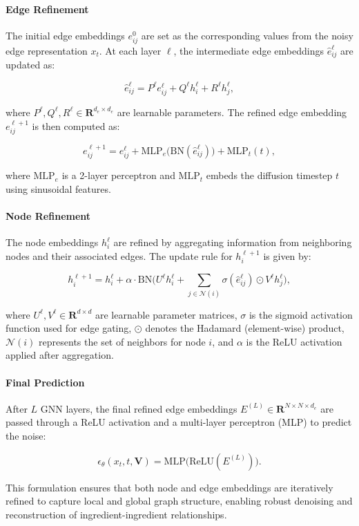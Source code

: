 \paragraph{Edge Refinement} The initial edge embeddings \( e_{ij}^0 \) are set as the corresponding values from the noisy edge representation \( x_t \). At each layer \( \ell \), the intermediate edge embeddings \( \hat{e}_{ij}^\ell \) are updated as:

\begin{equation*}
    \hat{e}_{ij}^\ell = P^\ell e_{ij}^\ell + Q^\ell h_i^\ell + R^\ell h_j^\ell,
\end{equation*}

where \( P^\ell, Q^\ell, R^\ell \in \mathbf{R}^{d_e \times d_e} \) are learnable parameters. The refined edge embedding \( e_{ij}^{\ell+1} \) is then computed as:

\begin{equation*}
    e_{ij}^{\ell+1} = e_{ij}^\ell + \text{MLP}_e\big(\text{BN}(\hat{e}_{ij}^\ell)\big) + \text{MLP}_t(t),
\end{equation*}

where \( \text{MLP}_e \) is a 2-layer perceptron and \( \text{MLP}_t \) embeds the diffusion timestep \( t \) using sinusoidal features.

\paragraph{Node Refinement}
The node embeddings \( h_i^\ell \) are refined by aggregating information from neighboring nodes and their associated edges. The update rule for \( h_i^{\ell+1} \) is given by:

\begin{equation*}
    h_i^{\ell+1} = h_i^\ell + \alpha \cdot \text{BN}\Big(U^\ell h_i^\ell + \sum_{j \in \mathcal{N}(i)} \sigma(\hat{e}_{ij}^\ell) \odot V^\ell h_j^\ell\Big),
\end{equation*}

where \( U^\ell, V^\ell \in \mathbf{R}^{d \times d} \) are learnable parameter matrices, \( \sigma \) is the sigmoid activation function used for edge gating, \( \odot \) denotes the Hadamard (element-wise) product, \( \mathcal{N}(i) \) represents the set of neighbors for node \( i \), and \( \alpha \) is the ReLU activation applied after aggregation.

\paragraph{Final Prediction}
After \( L \) GNN layers, the final refined edge embeddings \( E^{(L)} \in \mathbf{R}^{N \times N \times d_e} \) are passed through a ReLU activation and a multi-layer perceptron (MLP) to predict the noise:

\begin{equation*}
    \epsilon_{\theta}(x_t, t, \mathbf{V}) = \text{MLP}\big(\text{ReLU}(E^{(L)})\big).
\end{equation*}

This formulation ensures that both node and edge embeddings are iteratively refined to capture local and global graph structure, enabling robust denoising and reconstruction of ingredient-ingredient relationships.
